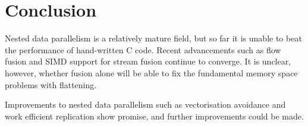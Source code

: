 \section{Conclusion}

Nested data parallelism is a relatively mature field, but so far it is unable to beat the performance of hand-written C code.
Recent advancements such as flow fusion\cite{lippmeier2013flow} and SIMD support for stream fusion\cite{mainland2013haskell}
continue to converge.
It is unclear, however, whether fusion alone will be able to fix the fundamental memory space problems with flattening\cite{lippmeier2012work}.

Improvements to nested data parallelism such as vectorisation avoidance\cite{keller2012vectorisation} and work efficient replication\cite{lippmeier2012work}
show promise, and further improvements could be made.
